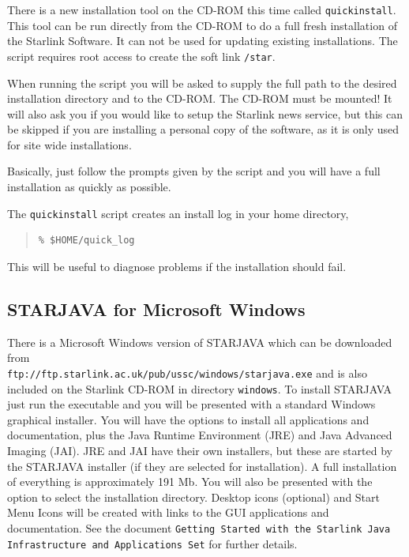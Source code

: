 \documentclass[twoside,11pt]{article}
\newcommand{\htmladdnormallink}[2]{#1}
\newcommand{\xref}[3]{#1}
\newcommand{\xlabel}[1]{}
\renewcommand{\_}{\texttt{\symbol{95}}}
\begin{document}
There is a new installation tool on the CD-ROM this time called \texttt{quick\_install}.
This tool can be run directly from the CD-ROM to do a full fresh installation of
the Starlink Software. It can not be used for updating existing installations. 
The script requires root access to create the soft link \texttt{/star}. 

When running the script you will be asked to supply the full path to the
desired installation directory and to the CD-ROM. The CD-ROM must be mounted!
It will also ask you if you would like to setup the Starlink news service,
but this can be skipped if you are installing a personal copy of the software,
as it is only used for site wide installations.  

Basically, just follow the prompts given by the script and you will have a
full installation as quickly as possible.

The \texttt{quick\_install} script creates an install log in your home directory,

\begin{quote}
\begin{verbatim}
% $HOME/quick_log 
\end{verbatim}
\end{quote}

This will be useful to diagnose problems if the installation should fail.

\subsection{\label{windows}\xlabel{windows}STARJAVA for Microsoft Windows}

There is a Microsoft Windows version of STARJAVA which can be downloaded from \\
\htmladdnormallink{\texttt{ftp://ftp.starlink.ac.uk/pub/ussc/windows/starjava.exe}}{ftp://ftp.starlink.ac.uk/pub/ussc/windows/starjava.exe} 
and is also included on the Starlink CD-ROM in directory \texttt{windows}. 
To install STARJAVA just run the executable and you will be presented with a standard 
Windows graphical installer. You will have the options to install all applications and 
documentation, plus the Java Runtime Environment (JRE) and Java Advanced Imaging (JAI). 
JRE and JAI have their own installers, but these are started by the STARJAVA installer 
(if they are selected for installation). A full installation of everything is approximately 
191 Mb. You will also be presented with the option to select the installation directory.
Desktop icons (optional) and Start Menu Icons will be created with links to the 
GUI applications and documentation. See the document \xref{}{sun251}{}
\texttt{Getting Started with the Starlink Java Infrastructure and Applications Set} 
for further details.
\end{document}
